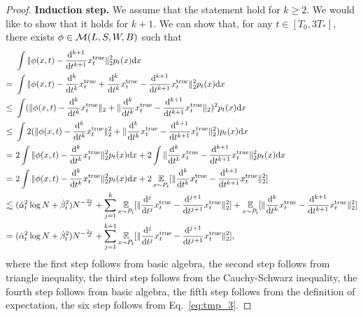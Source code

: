 \begin{proof}
    \textbf{Induction step.} We assume that the statement hold for $k \geq 2$. We would like to show that it holds for $k+1$. We can show that, for any $t \in [T_0, 3T_*]$, there exists $\phi \in {\cal M}(L,S,W, B)$ such that
    \begin{align}
    &~ \int \|\phi(x, t) - \frac{\mathrm{d}^{k+1}}{\mathrm{d} t^{k+1}}{x}_t^\mathrm{true}\|^2_2 p_t(x) \mathrm{d} x \notag
    \\ = &~
    \int \|\phi(x, t) - \frac{\mathrm{d}^{k}}{\mathrm{d} t^{k}}{x}_t^\mathrm{true} + \frac{\mathrm{d}^{k}}{\mathrm{d} t^{k}}{x}_t^\mathrm{true} - \frac{\mathrm{d}^{k+1}}{\mathrm{d} t^{k+1}}{x}_t^\mathrm{true}\|^2_2 p_t(x) \mathrm{d} x \notag \\
    \leq &~ \int (\|\phi(x, t) - \frac{\mathrm{d}^{k}}{\mathrm{d} t^{k}}{x}_t^\mathrm{true}\|_2 + \| \frac{\mathrm{d}^{k}}{\mathrm{d} t^{k}}{x}_t^\mathrm{true} - \frac{\mathrm{d}^{k+1}}{\mathrm{d} t^{k+1}}{x}_t^\mathrm{true}\|_2 )^2 p_t(x) \mathrm{d} x \notag \\
    \leq &~ \int 2(\|\phi(x, t) - \frac{\mathrm{d}^{k}}{\mathrm{d} t^{k}}{x}_t^\mathrm{true}\|_2^2 + \| \frac{\mathrm{d}^{k}}{\mathrm{d} t^{k}}{x}_t^\mathrm{true} - \frac{\mathrm{d}^{k+1}}{\mathrm{d} t^{k+1}}{x}_t^\mathrm{true}\|_2^2) p_t(x) \mathrm{d} x \notag \\
    = &~ 2\int \|\phi(x, t) - \frac{\mathrm{d}^{k}}{\mathrm{d} t^{k}}{x}_t^\mathrm{true}\|_2^2p_t(x) \mathrm{d} x + 2 \int \| \frac{\mathrm{d}^{k}}{\mathrm{d} t^{k}}{x}_t^\mathrm{true} - \frac{\mathrm{d}^{k+1}}{\mathrm{d} t^{k+1}}{x}_t^\mathrm{true}\|_2^2 p_t(x) \mathrm{d} x \notag \\
    = &~ 2\int \|\phi(x, t) - \frac{\mathrm{d}^{k}}{\mathrm{d} t^{k}}{x}_t^\mathrm{true}\|_2^2p_t(x) \mathrm{d} x + 2 \operatorname*{{\mathbb{E}}}_{x \sim P_t} [ \| \frac{\mathrm{d}^{k}}{\mathrm{d} t^{k}}{x}_t^\mathrm{true} - \frac{\mathrm{d}^{k+1}}{\mathrm{d} t^{k+1}}{x}_t^\mathrm{true}\|_2^2]\notag \\
    \lesssim &~ (\dot{\alpha}_t^2 \log N + \dot{\beta}_t^2 ) N^{- \frac{2s}{d}} +
    \sum_{j=1}^{k}\operatorname*{{\mathbb{E}}}_{x \sim P_t}[\|\frac{\mathrm{d}^{j}}{\mathrm{d} t^{j}}x_t^\mathrm{true} - \frac{\mathrm{d}^{j+1}}{\mathrm{d} t^{j+1}}x_t^\mathrm{true}\|_2^2] + \operatorname*{{\mathbb{E}}}_{x \sim P_t} [ \| \frac{\mathrm{d}^{k}}{\mathrm{d} t^{k}}{x}_t^\mathrm{true} - \frac{\mathrm{d}^{k+1}}{\mathrm{d} t^{k+1}}{x}_t^\mathrm{true}\|_2^2]\notag \\
    = &~ (\dot{\alpha}_t^2 \log N + \dot{\beta}_t^2 ) N^{- \frac{2s}{d}} +
    \sum_{j=1}^{k+1}\operatorname*{{\mathbb{E}}}_{x \sim P_t}[\|\frac{\mathrm{d}^{j}}{\mathrm{d} t^{j}}x_t^\mathrm{true} - \frac{\mathrm{d}^{j+1}}{\mathrm{d} t^{j+1}}x_t^\mathrm{true}\|_2^2], \label{eq:tmp_4}
    \end{align}
    where the first step follows from basic algebra, the second step follows from triangle inequality, the third step follows from the Cauchy-Schwarz inequality, the fourth step follows from basic algebra, the fifth step follows from the definition of expectation, the six step follows from Eq.~\eqref{eq:tmp_3}.
    

\end{proof}
